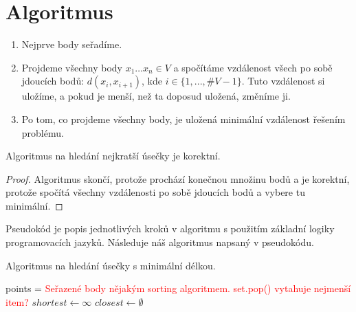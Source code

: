 \section{Algoritmus}
\label{sec:algoritmus_1D}
\begin{enumerate}
    \item Nejprve body seřadíme.
    \item Projdeme všechny body $x_1\ldots x_n \in V$ a spočítáme vzdálenost všech po sobě jdoucích bodů: $d(x_i, x_{i+1})$, kde $i \in \{1,...,\#V-1\}$. Tuto vzdálenost si uložíme, a pokud je menší, než ta doposud uložená, změníme ji.
    \item Po tom, co projdeme všechny body, je uložená minimální vzdálenost řešením problému.
\end{enumerate}
\begin{tvrzeni}
    Algoritmus na hledání nejkratší úsečky je korektní.
\end{tvrzeni}
\begin{proof}
    Algoritmus skončí, protože prochází konečnou množinu bodů a je korektní, protože spočítá všechny vzdálenosti po sobě jdoucích bodů a vybere tu minimální.
\end{proof}
\begin{poznamka}
    Pseudokód je popis jednotlivých kroků v algoritmu s použitím základní logiky programovacích jazyků. Následuje náš algoritmus napsaný v pseudokódu.
\end{poznamka}
\begin{algorithm}
    \caption{Algoritmus na hledání úsečky s minimální délkou.}
    \label{alg:algoritmus_1D}


    \BlankLine
    points = \textcolor{red}{Seřazené body nějakým sorting algoritmem. set.pop() vytahuje nejmenší item?} \;
    $shortest \leftarrow \infty$ \;
    $ closest \leftarrow \emptyset $ \;
\end{algorithm}